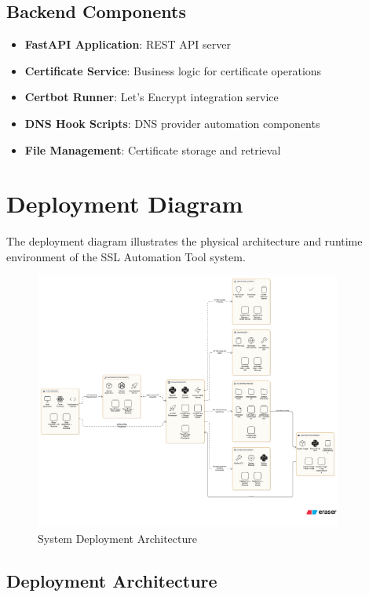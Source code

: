 \subsection{Backend Components}

\begin{itemize}
    \item \textbf{FastAPI Application}: REST API server
    \item \textbf{Certificate Service}: Business logic for certificate operations
    \item \textbf{Certbot Runner}: Let's Encrypt integration service
    \item \textbf{DNS Hook Scripts}: DNS provider automation components
    \item \textbf{File Management}: Certificate storage and retrieval
\end{itemize}

\section{Deployment Diagram}

The deployment diagram illustrates the physical architecture and runtime environment of the SSL Automation Tool system.

\begin{figure}[h]
\centering
\includegraphics[width=0.9\textwidth]{diagram-images/3.5-deployment-diagram.png}
\caption{System Deployment Architecture}
\label{fig:deployment-diagram}
\end{figure}

\subsection{Deployment Architecture}

